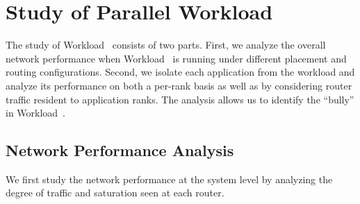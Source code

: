 
\section{Study of Parallel Workload~}
\label{sec:workload-1}

The study of Workload~ consists of two parts. First, we analyze the overall network performance when Workload~ is running under different placement and routing configurations. Second, we isolate each application from the workload and analyze its performance on both a per-rank basis as well as by considering router traffic resident to application ranks. The analysis allows us to identify the ``bully'' in Workload~.


\subsection{Network Performance Analysis}
\label{sec: workload-1 network analysis}

We first study the network performance at the system level by analyzing the degree of traffic and saturation seen at each router.

